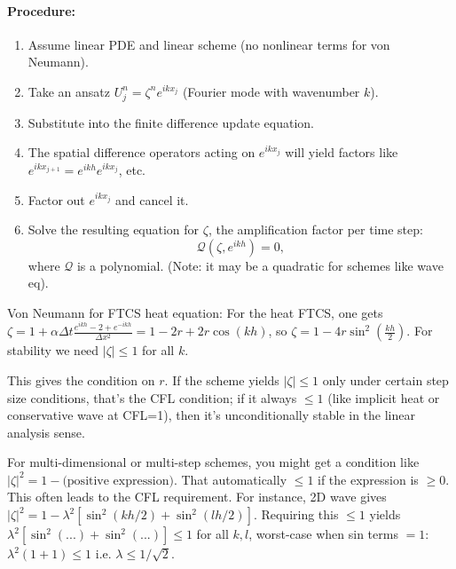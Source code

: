 \documentclass[a4paper,11pt]{report}
\begin{document}
\paragraph{Procedure:}
\begin{enumerate}
    \item Assume linear PDE and linear scheme (no nonlinear terms for von Neumann).

    \item Take an ansatz $U_{j}^n = \zeta^n e^{i k x_j}$ (Fourier mode with wavenumber $k$).

    \item Substitute into the finite difference update equation.

    \item The spatial difference operators acting on $e^{i k x_j}$ will yield factors like $e^{i k x_{j+1}} = e^{i k h}e^{i k x_j}$, etc.

    \item Factor out $e^{i k x_j}$ and cancel it.

    \item Solve the resulting equation for $\zeta$, the amplification factor per time step:
          $$\mathcal{Q}(\zeta, e^{ik h}) = 0,$$
          where $\mathcal{Q}$ is a polynomial. (Note: it may be a quadratic for schemes like wave eq).
\end{enumerate}

\begin{example}{Von Neumann for FTCS heat equation:}
    For the heat FTCS, one gets $\zeta = 1 + \alpha \Delta t \frac{e^{i k h} - 2 + e^{-i k h}}{\Delta x^2} = 1 - 2r + 2r\cos(kh)$, so $\zeta = 1 - 4r\sin^2(\frac{k h}{2})$. For stability we need $|\zeta| \le 1$ for all $k$.

    This gives the condition on $r$. If the scheme yields $|\zeta| \le 1$ only under certain step size conditions, that's the CFL condition; if it always $\le1$ (like implicit heat or conservative wave at CFL=1), then it's unconditionally stable in the linear analysis sense.

\end{example}

For multi-dimensional or multi-step schemes, you might get a condition like $|\zeta|^2 = 1 - \text{(positive expression)}$. That automatically $\le1$ if the expression is $\ge0$. This often leads to the CFL requirement. For instance, 2D wave gives $|\zeta|^2 = 1 - \lambda^2[ \sin^2(kh/2)+\sin^2(lh/2) ]$. Requiring this $\le1$ yields $\lambda^2[ \sin^2(...)+\sin^2(...) ] \le 1$ for all $k,l$, worst-case when sin terms $=1$: $\lambda^2(1+1)\le1$ i.e. $\lambda \le 1/\sqrt{2}$.
\end{document}
